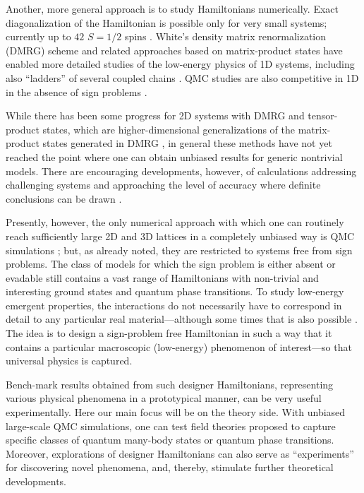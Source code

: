 \documentclass[10pt,pre,aps,twocolumn,showpacs,superscriptaddress,floatfix]{revtex4-1}
\begin{document}
Another, more general approach is to study Hamiltonians numerically. Exact diagonalization of the Hamiltonian is possible 
only for very small systems; currently up to $42$ $S=1/2$ spins \cite{Nakano11,Lauchli11}. White's density matrix 
renormalization (DMRG) scheme \cite{White92} and related approaches based on matrix-product states \cite{Schollwock05} 
have enabled more detailed studies of the low-energy physics of 1D systems, including also ``ladders'' of several coupled chains
\cite{Dagotto96}. QMC studies are also competitive in 1D in the absence of sign problems \cite{Sandvik04,Jeckelmann02,Mund09}.

While there has been some progress for 2D systems with DMRG \cite{Stoudenmire12} and tensor-product \cite{Murg09,Gu08,Xie09} states, which are
higher-dimensional generalizations of the  matrix-product states generated in DMRG \cite{Rommer97}, in general these methods have not yet reached the point 
where one  can obtain unbiased results for generic nontrivial models. There are encouraging developments, however, of calculations addressing challenging systems and 
approaching the level of accuracy where definite conclusions can be drawn \cite{Yan11,Bauer12}.

Presently, however, the only numerical approach with which one can routinely reach sufficiently large 2D and 3D lattices in a completely unbiased way 
is QMC simulations \cite{Evertz03,Sandvik10b}; but, as already noted, they are restricted to systems free from sign problems. The class of models 
for which the sign problem is either absent or evadable
still contains a vast range of Hamiltonians with non-trivial and interesting 
ground states and quantum phase transitions. To study low-energy emergent properties, the interactions do not necessarily have to correspond in detail to 
any particular real material---although some times that is also possible \cite{Zvyagin07}. The idea is to design a sign-problem free Hamiltonian in such a way that it contains 
a particular macroscopic (low-energy) phenomenon of interest---so that universal physics is captured. 

Bench-mark results obtained from such designer Hamiltonians, representing various physical phenomena in a prototypical manner, can be very useful experimentally. 
Here our main focus will be on the theory side. With unbiased large-scale QMC simulations, one can test field theories proposed to capture specific classes of 
quantum many-body states or quantum phase transitions. Moreover, explorations of designer Hamiltonians can also serve as ``experiments'' for discovering 
novel phenomena, and, thereby, stimulate further theoretical developments.
\end{document}

